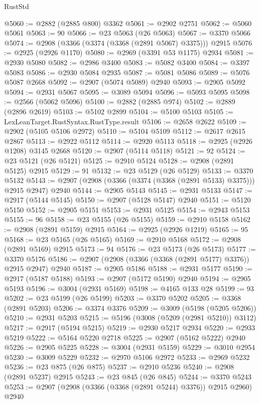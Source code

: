 \begin{lexlean}{RustStd}
\begin{coremodule}
@5060 := @2882 (@2885 @800) @3362
@5061 := @2902 @2751
@5062 := @5060 @5061
@5063 := 90
@5066 := @23 @5063 (@26 @5063)
@5067 := @3370 @5066
@5074 := @2908 (@3366 (@3374 (@3368 (@2891 @5067) @3375))) @2915
@5076 := @2925 (@2926 @1170)
@5080 := @2969 (@3391 @53 @1175) @2934
@5081 := @2930 @5080
@5082 := @2986 @3400
@5083 := @5082 @3400
@5084 := @3397 @5083
@5086 := @2930 @5084 @2935
@5087 := @5081 @5086
@5089 := @5076 @5087 @2668
@5092 := @2907 (@5074 @5089) @2940
@5093 := @2905 @5092
@5094 := @2931 @5067
@5095 := @3089 @5094
@5096 := @5093 @5095
@5098 := @2566 (@5062 @5096)
@5100 := @2882 (@2885 @974)
@5102 := @2889 (@2896 @2619)
@5103 := @5102 @2899
@5104 := @5100 @5103
@5105 := LexLeanTarget.RustSyntax.RustType.result
@5106 := @2658 @2622
@5109 := @2902 (@5105 @5106 @2972)
@5110 := @5104 @5109
@5112 := @2617 @2615 @2867
@5113 := @2922 @5112
@5114 := @2920 @5113
@5118 := @2925 (@2926 @1208) @3145 @2668
@5120 := @2907 (@5114 @5118)
@5121 := 92
@5124 := @23 @5121 (@26 @5121)
@5125 := @2910 @5124
@5128 := @2908 (@2891 @5125) @2915
@5129 := 91
@5132 := @23 @5129 (@26 @5129)
@5133 := @3370 @5132
@5143 := @2907 (@2908 (@3366 (@3374 (@3368 (@2891 @5133) @3375))) @2915 @2947) @2940
@5144 := @2905 @5143
@5145 := @2931 @5133
@5147 := @2917 (@5144 @5145)
@5150 := @2907 (@5128 @5147) @2940
@5151 := @5120 @5150
@5152 := @2905 @5151
@5153 := @2931 @5125
@5154 := @2943 @5153
@5155 := 96
@5158 := @23 @5155 (@26 @5155)
@5159 := @2910 @5158
@5162 := @2908 (@2891 @5159) @2915
@5164 := @2925 (@2926 @1219)
@5165 := 95
@5168 := @23 @5165 (@26 @5165)
@5169 := @2910 @5168
@5172 := @2908 (@2891 @5169) @2915
@5173 := 94
@5176 := @23 @5173 (@26 @5173)
@5177 := @3370 @5176
@5186 := @2907 (@2908 (@3366 (@3368 (@2891 @5177) @3376)) @2915 @2947) @2940
@5187 := @2905 @5186
@5188 := @2931 @5177
@5190 := @2917 (@5187 @5188)
@5193 := @2907 (@5172 @5190) @2940
@5194 := @2905 @5193
@5196 := @3004 (@2931 @5169)
@5198 := @4165 @133 @28
@5199 := 93
@5202 := @23 @5199 (@26 @5199)
@5203 := @3370 @5202
@5205 := @3368 (@2891 @5203)
@5206 := @3374 @3376
@5209 := @3009 (@5198 (@5205 @5206))
@5210 := @2931 @5203
@5215 := @5196 (@3008 (@5209 (@2981 @5210)) @3112)
@5217 := @2917 (@5194 @5215)
@5219 := @2930 @5217 @2934
@5220 := @2933 @5219
@5222 := @5164 @5220 @2718
@5225 := @2907 (@5162 @5222) @2940
@5226 := @2905 @5225
@5228 := @3004 (@2931 @5159)
@5229 := @3010 @2954
@5230 := @3009 @5229
@5232 := @2970 @5106 @2972
@5233 := @2969 @5232
@5236 := @23 @875 (@26 @875)
@5237 := @2910 @5236
@5240 := @2908 (@2891 @5237) @2915
@5243 := @23 @845 (@26 @845)
@5244 := @3370 @5243
@5253 := @2907 (@2908 (@3366 (@3368 (@2891 @5244) @3376)) @2915 @2960) @2940

\end{coremodule}
\end{lexlean}
